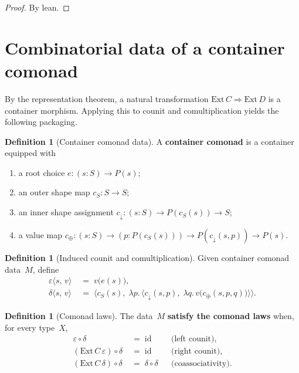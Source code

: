 \documentclass[11pt,a4paper]{article}
\theoremstyle{plain}
\theoremstyle{definition}
\newtheorem{definition}[theorem]{Definition}
\newcommand{\Ext}{\mathrm{Ext}}
\newcommand{\id}{\mathrm{id}}
\begin{document}
\begin{proof}
By lean.
\end{proof}

\section{Combinatorial data of a container comonad}

By the representation theorem, a natural transformation
$\Ext\,C \Longrightarrow \Ext\,D$ is a container morphism. Applying this to
counit and comultiplication yields the following packaging.

\begin{definition}[Container comonad data]\label{def:container-comonad}
A \textbf{container comonad} is a container equipped with
\begin{enumerate}
  \item a root choice $e : (s : S) \to P(s)$;
  \item an outer shape map $c_S : S \to S$;
  \item an inner shape assignment
        $c_{\downarrow} : (s : S) \to P(c_S(s)) \to S$;
  \item a value map
        $c_{\oplus} : (s : S) \to (p : P(c_S(s))) \to
          P(c_{\downarrow}(s,p)) \to P(s)$.
\end{enumerate}
\end{definition}

\begin{definition}[Induced counit and comultiplication]\label{def:counit-comult}
Given container comonad data~$M$, define
\begin{align}
  \varepsilon\langle s,\, v\rangle
  &\;=\;
  v\bigl(e(s)\bigr), \\[4pt]
  \delta\langle s,\, v\rangle
  &\;=\;
  \bigl\langle
    c_S(s),\;
    \lambda p.\,
      \bigl\langle
        c_{\downarrow}(s,p),\;
        \lambda q.\, v\bigl(c_{\oplus}(s,p,q)\bigr)
      \bigr\rangle
  \bigr\rangle.
\end{align}
\end{definition}

\begin{definition}[Comonad laws]\label{def:is-comonad}
The data~$M$ \textbf{satisfy the comonad laws} when, for every type~$X$,
\begin{align}
  \varepsilon \circ \delta &\;=\; \id &&\text{(left counit),} \\
  (\Ext\,C\,\varepsilon) \circ \delta &\;=\; \id &&\text{(right counit),} \\
  (\Ext\,C\,\delta) \circ \delta &\;=\; \delta \circ \delta
    &&\text{(coassociativity).}
\end{align}
\end{definition}
\end{document}
